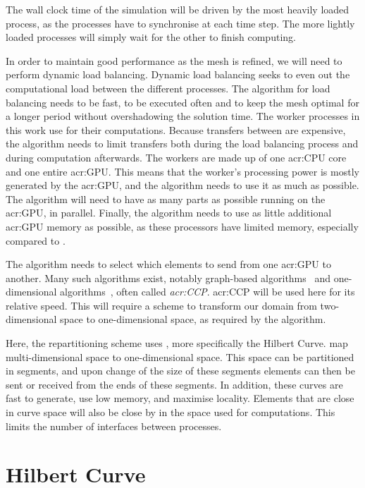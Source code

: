 The wall clock time of the simulation will be driven by the most heavily loaded process, as the
processes have to synchronise at each time step. The more lightly loaded processes will simply wait
for the other to finish computing.

In order to maintain good performance as the mesh is refined, we will need to perform dynamic load
balancing. Dynamic load balancing seeks to even out the computational load between the different
processes. The algorithm for load balancing needs to be fast, to be executed often and to keep the
mesh optimal for a longer period without overshadowing the solution time. The worker processes in
this work use  for their computations. Because transfers between
 are expensive, the algorithm needs to limit transfers both during the load
balancing process and during computation afterwards. The workers are made up of one
\acrshort{acr:CPU} core and one entire \acrshort{acr:GPU}. This means that the worker's processing
power is mostly generated by the \acrshort{acr:GPU}, and the algorithm needs to use it as much as
possible. The algorithm will need to have as many parts as possible running on the
\acrshort{acr:GPU}, in parallel. Finally, the algorithm needs to use as little additional
\acrshort{acr:GPU} memory as possible, as these processors have limited memory, especially compared
to .

The algorithm needs to select which elements to send from one \acrshort{acr:GPU} to another. Many
such algorithms exist, notably graph-based algorithms~\cite{Karypis1998} and one-dimensional
algorithms~\cite{Pinar2004}, often called \textit{\acrfull{acr:CCP}}. \Acrlong{acr:CCP} will be used
here for its relative speed. This will require a scheme to transform our domain from two-dimensional
space to one-dimensional space, as required by the algorithm.

Here, the repartitioning scheme uses \textit{}, more specifically the Hilbert
Curve.  map multi-dimensional space to one-dimensional space. This space can be
partitioned in segments, and upon change of the size of these segments elements can then be sent or
received from the ends of these segments. In addition, these curves are fast to generate, use low
memory, and maximise locality. Elements that are close in curve space will also be close by in the
space used for computations. This limits the number of interfaces between processes.

\section{Hilbert Curve}\label{section:load_balancing:hilbert_curve}

